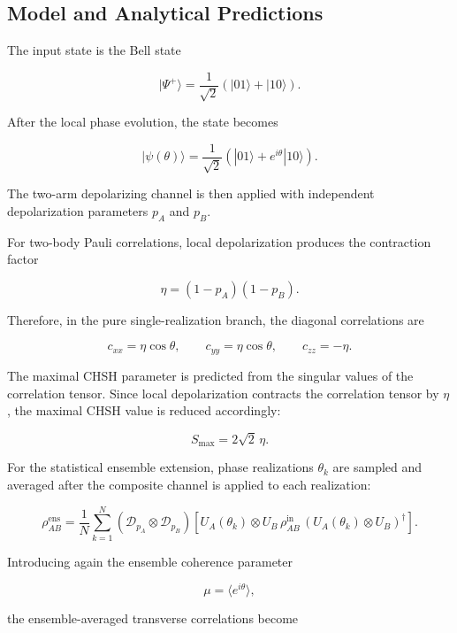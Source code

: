 \subsection*{Model and Analytical Predictions}

The input state is the Bell state

\[
|\Psi^+\rangle
=
\frac{1}{\sqrt{2}}
\left(
|01\rangle + |10\rangle
\right).
\]

After the local phase evolution, the state becomes

\[
|\psi(\theta)\rangle
=
\frac{1}{\sqrt{2}}
\left(
|01\rangle + e^{i\theta}|10\rangle
\right).
\]

The two-arm depolarizing channel is then applied with independent depolarization parameters \( p_A \) and \( p_B \).

For two-body Pauli correlations, local depolarization produces the contraction factor

\begin{equation}
\eta
=
(1-p_A)(1-p_B).
\label{eq:experiment5_eta_definition}
\end{equation}

Therefore, in the pure single-realization branch, the diagonal correlations are

\[
c_{xx}
=
\eta \cos\theta,
\qquad
c_{yy}
=
\eta \cos\theta,
\qquad
c_{zz}
=
-\eta.
\]

The maximal CHSH parameter is predicted from the singular values of the correlation tensor. Since local depolarization contracts the correlation tensor by \( \eta \), the maximal CHSH value is reduced accordingly:

\[
S_{\max}
=
2\sqrt{2}\,\eta.
\]

For the statistical ensemble extension, phase realizations \( \theta_k \) are sampled and averaged after the composite channel is applied to each realization:

\begin{equation}
\rho_{AB}^{\mathrm{ens}}
=
\frac{1}{N}
\sum_{k=1}^{N}
\left(
\mathcal{D}_{p_A}
\otimes
\mathcal{D}_{p_B}
\right)
\left[
U_A(\theta_k)
\otimes
U_B
\,
\rho_{AB}^{\mathrm{in}}
\,
\left(
U_A(\theta_k)
\otimes
U_B
\right)^{\dagger}
\right].
\label{eq:experiment5_composite_ensemble}
\end{equation}

Introducing again the ensemble coherence parameter

\[
\mu
=
\langle e^{i\theta} \rangle,
\]

the ensemble-averaged transverse correlations become

